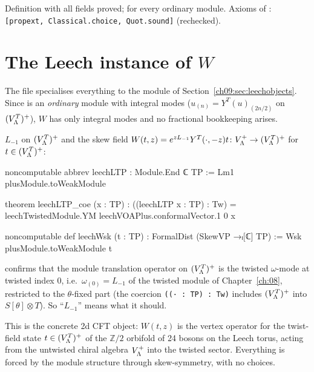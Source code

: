 \begin{status}
Definition with all fields proved; for every ordinary module. Axioms of :
\texttt{[propext, Classical.choice, Quot.sound]} (rechecked).
\end{status}

\section{The Leech instance of \texorpdfstring{$W$}{W}}\label{ch09:sec:Wleech}

The file  specialises everything to the module
 of Section~\ref{ch09:sec:leechobjects}. Since  is an
\emph{ordinary} module with integral modes ($u_{(n)}=Y^T(u)_{(2n/2)}$ on $(V_{\Lambda}^{T})^{+}$), $W$ has only
integral modes and no fractional bookkeeping arises.

\begin{definition}\label{ch09:def:leechWsk}
$L_{-1}$ on $(V_{\Lambda}^{T})^{+}$ and the skew field
$W(t,z)=e^{zL_{-1}}Y^T(\cdot,-z)t\colon V_{\Lambda}^{+}\to(V_{\Lambda}^{T})^{+}$ for $t\in(V_{\Lambda}^{T})^{+}$:
\end{definition}
\begin{leancode}
noncomputable abbrev leechLTP : Module.End ℂ TP := Lm1 plusModule.toWeakModule

theorem leechLTP_coe (x : TP) :
    ((leechLTP x : TP) : Tw) = leechTwistedModule.YM leechVOAPlus.conformalVector.1 0 x

noncomputable def leechWsk (t : TP) : FormalDist (SkewVP →ₗ[ℂ] TP) :=
  Wsk plusModule.toWeakModule t
\end{leancode}
\begin{dictionary}
 confirms that the module translation operator on $(V_{\Lambda}^{T})^{+}$ is the twisted
$\omega$-mode at twisted index $0$, i.e.\ $\omega_{(0)}=L_{-1}$ of the twisted module of
Chapter~\ref{ch:08}, restricted to the $\theta$-fixed part (the coercion
\texttt{((· : TP) : Tw)} includes $(V_{\Lambda}^{T})^{+}$ into $S[\theta]\otimes T$). So ``$L_{-1}$'' means
what it should.
\end{dictionary}

\begin{physics}
This is the concrete 2d CFT object: $W(t,z)$ is the vertex operator for the twist-field state $t\in(V_{\Lambda}^{T})^{+}$ of the $\mathbb Z/2$ orbifold of 24 bosons on the Leech torus, acting from the untwisted chiral algebra $V_{\Lambda}^{+}$ into the twisted sector. Everything is forced by the module structure through skew-symmetry, with no choices.
\end{physics}


